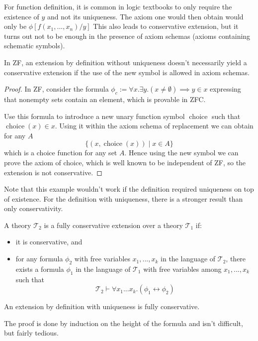 For function definition, it is common in logic textbooks to only require the existence of $y$ and not its uniqueness. The axiom one would then obtain would only be $\phi[f(x_1,...,x_n)/y]$ This also leads to conservative extension, but it turns out not to be enough in the presence of axiom schemas (axioms containing schematic symbols).
\begin{lemma}

In ZF, an extension by definition without uniqueness doesn't necessarily yield a conservative extension if the use of the new symbol is allowed in axiom schemas.

\end{lemma}
\begin{proof}
In ZF, consider the formula $\phi_c := \forall x. \exists y. (x \neq \emptyset) \implies y \in x$ expressing that nonempty sets contain an element, which is provable in ZFC.

Use this formula to introduce a new unary function symbol $\operatorname{choice}$ such that $\operatorname{choice}(x) \in x$. Using it within the axiom schema of replacement we can obtain for any $A$
$$
\lbrace (x, \operatorname{choice}(x)) \mid x \in A \rbrace
$$
which is a choice function for any set $A$. Hence using the new symbol we can prove the axiom of choice, which is well known to be independent of ZF, so the extension is not conservative.
\end{proof}
Note that this example wouldn't work if the definition required uniqueness on top of existence.
For the definition with uniqueness, there is a stronger result than only conservativity.
\begin{defin}
A theory $\mathcal{T}_2$ is a fully conservative extension over a theory $\mathcal{T}_1$ if:
\begin{itemize}

\item it is conservative, and
\item for any formula $\phi_2$ with free variables $x_1, ..., x_k$ in the language of $\mathcal{T}_2$, there exists a formula $\phi_1$ in the language of $\mathcal{T}_1$ with free variables among $x_1, ..., x_k$ such that
$$\mathcal{T}_2 \vdash \forall x_1...x_k. (\phi_1 \leftrightarrow \phi_2)$$
\end{itemize}
\end{defin}
\begin{thm}
An extension by definition with uniqueness is fully conservative.
\end{thm}
The proof is done by induction on the height of the formula and isn't difficult, but fairly tedious.
